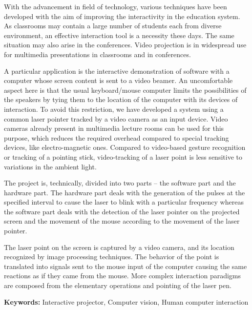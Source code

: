 	\vspace{0.5cm}	
        With the advancement in field of technology, various techniques have been developed with the aim of improving the interactivity in the education system. As classrooms may contain a large number of students each from diverse environment, an effective interaction tool is a necessity these days. The same situation may also arise in the conferences. Video projection is in widespread use for multimedia presentations in classrooms and in conferences. 

A particular application is the interactive demonstration of software with a computer whose screen content is sent to a video beamer. An uncomfortable aspect here is that the usual keyboard/mouse computer limits the possibilities of the speakers by tying them to the location of the computer with its devices of interaction. To avoid this restriction, we have developed a system using a common laser pointer tracked by a video camera as an input device. Video cameras already present in multimedia lecture rooms can be used for this purpose, which reduces the required overhead compared to special tracking devices, like electro-magnetic ones. Compared to video-based gesture recognition or tracking of a pointing stick, video-tracking of a laser point is less sensitive to variations in the ambient
light.

The project is, technically, divided into two parts – the software part and the hardware part. The hardware part deals with the generation of the pulses at the specified interval to cause the laser to blink with a particular frequency whereas the software part deals with the detection of the laser pointer on the projected screen and the movement of the mouse according to the movement of the laser pointer.

The laser point on the screen is captured by a video camera, and its location recognized by image processing techniques. The behavior of the point is translated into signals sent to the mouse input of the computer causing the same reactions as if they came from the mouse. More complex interaction paradigms are composed from the elementary operations  and pointing of the laser pen.

\noindent
\textbf{Keywords:} Interactive projector, Computer vision, Human computer interaction